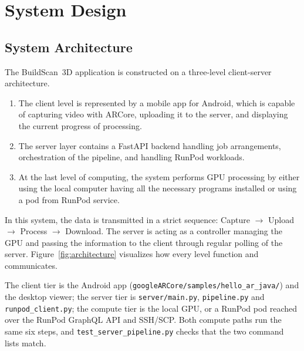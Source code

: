 \chapter{System Design}

\section{System Architecture}
The BuildScan~3D application is constructed on a three-level client-server architecture.

\begin{enumerate}
    \item The client level is represented by a mobile app for Android, which is capable of capturing video with ARCore, uploading it to the server, and displaying the current progress of processing.
    \item The server layer contains a FastAPI backend handling job arrangements, orchestration of the pipeline, and handling RunPod workloads.
    \item At the last level of computing, the system performs GPU processing by either using the local computer having all the necessary programs installed or using a pod from RunPod service.
\end{enumerate}

In this system, the data is transmitted in a strict sequence: Capture $\rightarrow$ Upload $\rightarrow$ Process $\rightarrow$ Download. The server is acting as a controller managing the GPU and passing the information to the client through regular polling of the server. Figure~\ref{fig:architecture} visualizes how every level function and communicates.

The client tier is the Android app (\texttt{googleARCore/samples/hello\_ar\_java/}) and the desktop viewer; the server tier is \texttt{server/main.py}, \texttt{pipeline.py} and \texttt{runpod\_client.py}; the compute tier is the local GPU, or a RunPod pod reached over the RunPod GraphQL API and SSH/SCP. Both compute paths run the same six steps, and \texttt{test\_server\_pipeline.py} checks that the two command lists match.

